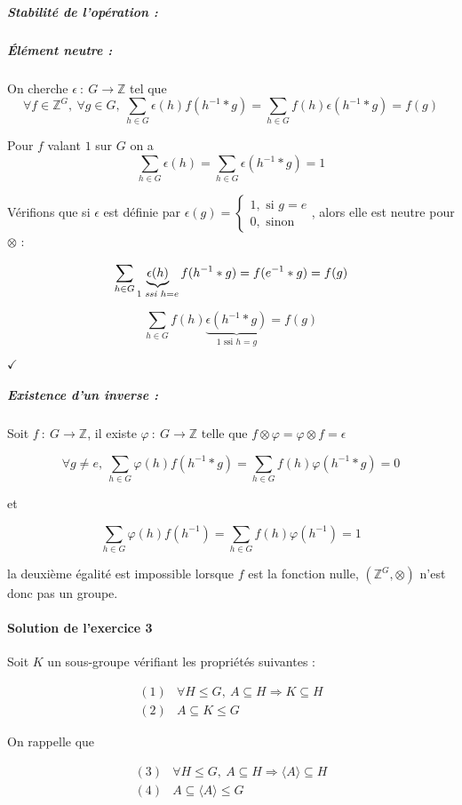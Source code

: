 \documentclass[]{article}
\theoremstyle{remark}
\theoremstyle{definition}
\newcommand{\checked}{
	\hfill$\checkmark$
}
\newcommand{\funcshort}[3]{
#1 ~ : ~ #2 \longrightarrow #3
}
\begin{document}
\subparagraph{Stabilité de l'opération :} \checkmark

\subparagraph{Élément neutre :} On cherche $\funcshort{\epsilon}{G}{\mathbb{Z}}$ tel que
$$\forall f \in \mathbb{Z}^G, ~ \forall g \in G, ~ \sum_{h \in G}\epsilon(h)f(h^{-1}*g)=\sum_{h \in G}f(h)\epsilon(h^{-1}*g)=f(g)$$

Pour $f$ valant $1$ sur $G$ on a
$$\sum_{h \in G}\epsilon(h)=\sum_{h \in G}\epsilon(h^{-1}*g)=1$$

Vérifions que si $\epsilon$ est définie par $\epsilon(g) = \left\{
\begin{array}{l}
	1, \text{ si } g = e \\
	0, \text{ sinon}
\end{array}
\right.$, alors elle est neutre pour $\otimes$ :

$$\sum_{h \in G}\underbrace{\epsilon(h)}_{1 \text{ \textit{ssi} } h = e}f(h^{-1}*g) = f(e^{-1}*g) = f(g)$$

$$\sum_{h \in G}f(h)\underbrace{\epsilon(h^{-1}*g)}_{1 \text{ ssi } h = g}=f(g)$$

\checked

\subparagraph{Existence d'un inverse :}
Soit $\funcshort{f}{G}{\mathbb{Z}}$, il existe $\funcshort{\varphi}{G}{\mathbb{Z}}$ telle que $f \otimes \varphi = \varphi \otimes f = \epsilon$

$$\forall g \neq e, ~ \sum_{h \in G}\varphi(h)f(h^{-1}*g)=\sum_{h \in G}f(h)\varphi(h^{-1}*g)=0$$

et

$$\sum_{h \in G}\varphi(h)f(h^{-1})=\sum_{h \in G}f(h)\varphi(h^{-1})=1$$

la deuxième égalité est impossible lorsque $f$ est la fonction nulle, $\left(\mathbb{Z}^G, \otimes\right)$ n'est donc pas un groupe.

\paragraph{Solution de l'exercice 3}
Soit $K$ un sous-groupe vérifiant les propriétés suivantes :

$$
	\begin{array}{lc}
		(1) & \forall H \leqslant G, ~ A \subseteq H \Longrightarrow K \subseteq H \\
		(2) & A \subseteq K \leqslant G
	\end{array}
$$

On rappelle que 

$$
	\begin{array}{lc}
		(3) & \forall H \leqslant G, ~ A \subseteq H \Longrightarrow \langle A \rangle \subseteq H \\
		(4) & A \subseteq \langle A \rangle \leqslant G
	\end{array}
$$
\end{document}
